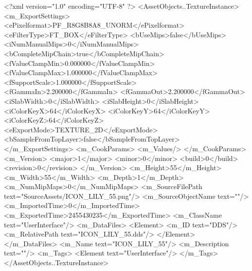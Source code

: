 <?xml version="1.0" encoding="UTF-8" ?>
<AssetObjects..TextureInstance>
	<m_ExportSettings>
		<ePixelformat>PF_R8G8B8A8_UNORM</ePixelformat>
		<eFilterType>FT_BOX</eFilterType>
		<bUseMips>false</bUseMips>
		<iNumManualMips>0</iNumManualMips>
		<bCompleteMipChain>true</bCompleteMipChain>
		<fValueClampMin>0.000000</fValueClampMin>
		<fValueClampMax>1.000000</fValueClampMax>
		<fSupportScale>1.000000</fSupportScale>
		<fGammaIn>2.200000</fGammaIn>
		<fGammaOut>2.200000</fGammaOut>
		<iSlabWidth>0</iSlabWidth>
		<iSlabHeight>0</iSlabHeight>
		<iColorKeyX>64</iColorKeyX>
		<iColorKeyY>64</iColorKeyY>
		<iColorKeyZ>64</iColorKeyZ>
		<eExportMode>TEXTURE_2D</eExportMode>
		<bSampleFromTopLayer>false</bSampleFromTopLayer>
	</m_ExportSettings>
	<m_CookParams>
		<m_Values/>
	</m_CookParams>
	<m_Version>
		<major>1</major>
		<minor>0</minor>
		<build>0</build>
		<revision>0</revision>
	</m_Version>
	<m_Height>55</m_Height>
	<m_Width>55</m_Width>
	<m_Depth>1</m_Depth>
	<m_NumMipMaps>0</m_NumMipMaps>
	<m_SourceFilePath text="SourceAssets/ICON_LILY_55.png"/>
	<m_SourceObjectName text=""/>
	<m_ImportedTime>0</m_ImportedTime>
	<m_ExportedTime>2455430235</m_ExportedTime>
	<m_ClassName text="UserInterface"/>
	<m_DataFiles>
		<Element>
			<m_ID text="DDS"/>
			<m_RelativePath text="ICON_LILY_55.dds"/>
		</Element>
	</m_DataFiles>
	<m_Name text="ICON_LILY_55"/>
	<m_Description text=""/>
	<m_Tags>
		<Element text="UserInterface"/>
	</m_Tags>
</AssetObjects..TextureInstance>

